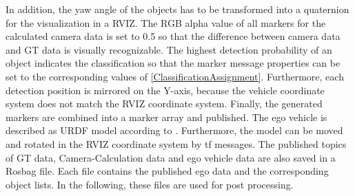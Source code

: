 In addition, the yaw angle of the objects has to be transformed into a quaternion for the visualization in a \ac{RVIZ}. The RGB alpha value of all markers for the calculated camera data is set to 0.5 so that the difference between camera data and GT data is visually recognizable. 
The highest detection probability of an object indicates the classification so that the marker message properties can be set to the corresponding values of \cref{ClassificationAssignment}. Furthermore, each detection position is mirrored on the Y-axis, because the vehicle coordinate system does not match the \ac{RVIZ} coordinate system. Finally, the generated markers are combined into a marker array and published.
The ego vehicle is described as URDF model according to \cite{URDF}.
Furthermore, the model can be moved and rotated in the \ac{RVIZ} coordinate system by tf messages. 
The published topics of \ac{GT} data, Camera-Calculation data and ego vehicle data are also saved in a Rosbag file. Each file contains the published ego data and the corresponding object lists. In the following, these files are used for post processing.
